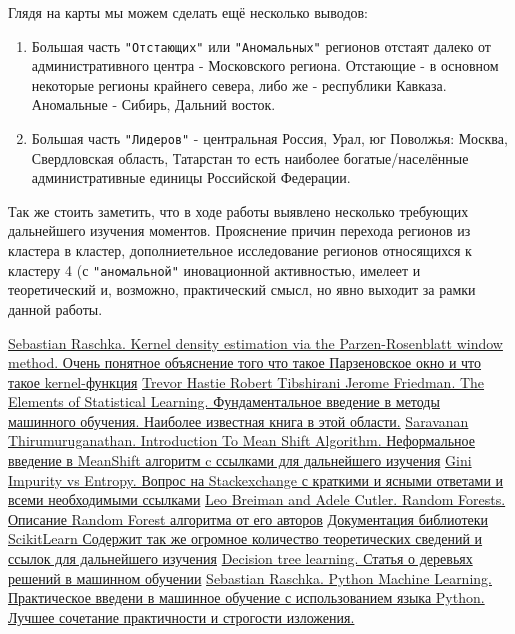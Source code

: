 \documentclass[11pt]{article}
\begin{document}
    Глядя на карты мы можем сделать ещё несколько выводов:

\begin{enumerate}
\item Большая часть \verb'"Отстающих"' или \verb'"Аномальных"' регионов отстаят далеко от административного центра - Московского региона. Отстающие - в основном некоторые регионы крайнего севера, либо же - республики Кавказа. Аномальные - Сибирь, Дальний восток.
\item Большая часть \verb'"Лидеров"' - центральная Россия, Урал, юг Поволжья: Москва, Свердловская область, Татарстан то есть наиболее богатые/населённые  административные единицы Российской Федерации.
\end{enumerate}

Так же стоить заметить, что в ходе работы выявлено несколько требующих
дальнейшего изучения моментов. Прояснение причин перехода регионов из
кластера в кластер, дополниетельное исследование регионов относящихся к
кластеру 4 (с \verb'"аномальной"' иновационной активностью, имелеет и
теоретический и, возможно, практический смысл, но явно выходит за рамки
данной работы.


\begin{thebibliography}{}
     \href{http://sebastianraschka.com/Articles/2014_kernel_density_est.html}{ Sebastian Raschka. Kernel density estimation via the Parzen-Rosenblatt window method. Очень понятное объяснение того что такое Парзеновское окно и что такое kernel-функция}
     \href{https://web.stanford.edu/~hastie/ElemStatLearn/} {Trevor Hastie Robert Tibshirani Jerome Friedman. The Elements of Statistical Learning.  Фундаментальное введение в методы машинного обучения. Наиболее известная книга в этой области.}
     \href{https://saravananthirumuruganathan.wordpress.com/about/} { Saravanan Thirumuruganathan. Introduction To Mean Shift Algorithm. Неформальное введение в MeanShift алгоритм c ссылками для дальнейшего изучения}
     \href{https://datascience.stackexchange.com/questions/10228/gini-impurity-vs-entropy} {Gini Impurity vs Entropy. Вопрос на Stackexchange с краткими и ясными ответами и всеми необходимыми ссылками}
     \href{https://www.stat.berkeley.edu/~breiman/RandomForests/cc_home.htm} {Leo Breiman and Adele Cutler. Random Forests. Описание Random Forest алгоритма от его авторов}
     \href{http://scikit-learn.org/stable/documentation.html} {Документация библиотеки ScikitLearn Содержит так же огромное количество теоретических сведений и ссылок для дальнейшего изучения}
     \href{https://en.wikipedia.org/wiki/Decision_tree_learning} {Decision tree learning. Статья о деревьях решений в машинном обучении}
     \href{https://www.amazon.com/Python-Machine-Learning-Sebastian-Raschka/dp/1783555130} {  Sebastian Raschka. Python Machine Learning. Практическое введени в машинное обучение с использованием языка Python. Лучшее сочетание практичности и строгости изложения.}
\end{thebibliography}


    
    
    
    
\end{document}
